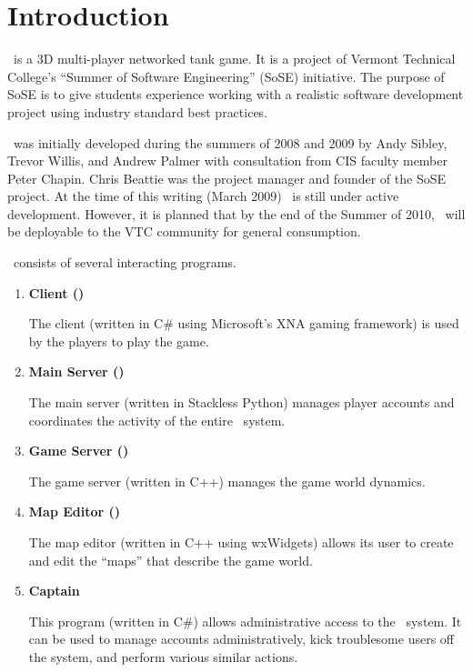%

\chapter{Introduction}
\label{introduction}

\VTank\ is a 3D multi-player networked tank game. It is a project of Vermont Technical College's ``Summer of Software Engineering'' (SoSE) initiative. The purpose of SoSE is to give students experience working with a realistic software development project using industry standard best practices.

\VTank\ was initially developed during the summers of 2008 and 2009 by Andy Sibley, Trevor Willis, and Andrew Palmer with consultation from CIS faculty member Peter Chapin. Chris Beattie was the project manager and founder of the SoSE project. At the time of this writing (March 2009) \VTank\ is still under active development. However, it is planned that by the end of the Summer of 2010, \VTank\ will be deployable to the VTC community for general consumption.

\VTank\ consists of several interacting programs.

\begin{enumerate}
\item \textbf{Client (\Client)}

The client (written in C\# using Microsoft's XNA gaming framework) is used by the players to play the game.

\item \textbf{Main Server (\MainServer)}

The main server (written in Stackless Python) manages player accounts and coordinates the activity of the entire \VTank\ system.

\item \textbf{Game Server (\GameServer)}

The game server (written in C++)  manages the game world dynamics.

\item \textbf{Map Editor (\MapEditor)}

The map editor (written in C++ using wxWidgets) allows its user to create and edit the ``maps'' that describe the game world.

\item \textbf{Captain \VTank}

This program (written in C\#) allows administrative access to the \VTank\ system. It can be used to manage accounts administratively, kick troublesome users off the system, and perform various similar actions.

\end{enumerate}

